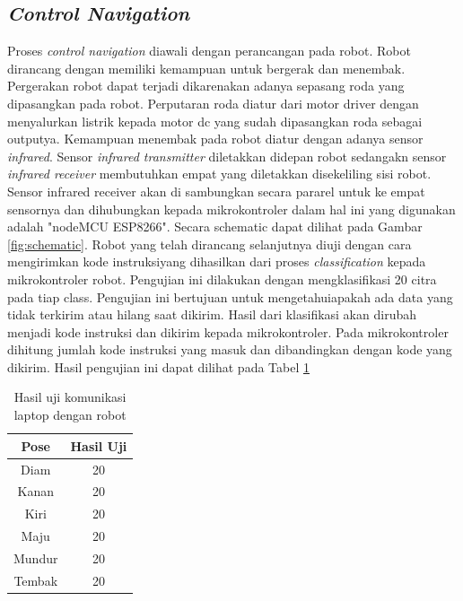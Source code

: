 \subsection{\emph{Control Navigation}}
Proses \emph{control navigation} diawali dengan perancangan pada robot. Robot dirancang dengan memiliki kemampuan untuk bergerak dan menembak. Pergerakan robot dapat terjadi dikarenakan adanya sepasang roda yang dipasangkan pada robot. Perputaran roda diatur dari motor driver dengan menyalurkan listrik kepada motor dc yang sudah dipasangkan roda sebagai outputya. Kemampuan menembak pada robot diatur dengan adanya sensor \emph{infrared}. Sensor \emph{infrared transmitter} diletakkan didepan robot sedangakn sensor \emph{infrared receiver} membutuhkan empat yang diletakkan disekeliling sisi robot. Sensor infrared receiver akan di sambungkan secara pararel untuk ke empat sensornya dan dihubungkan kepada mikrokontroler dalam hal ini yang digunakan adalah "nodeMCU ESP8266". Secara schematic dapat dilihat pada Gambar \ref{fig:schematic}. Robot yang telah dirancang selanjutnya diuji dengan cara mengirimkan kode instruksiyang dihasilkan dari proses \emph{classification} kepada mikrokontroler robot. Pengujian ini dilakukan dengan mengklasifikasi 20 citra pada tiap class. Pengujian ini bertujuan untuk mengetahuiapakah ada data yang tidak terkirim atau hilang saat dikirim. Hasil dari klasifikasi akan dirubah menjadi kode instruksi dan dikirim kepada mikrokontroler. Pada mikrokontroler dihitung jumlah kode instruksi yang masuk dan dibandingkan dengan kode yang dikirim. Hasil pengujian ini dapat dilihat pada Tabel \ref{tab:hasulujipose}

\begin{table}[H]
  \centering
  \caption{Hasil uji komunikasi laptop dengan robot}
  \label{tab:hasulujipose}
  \begin{tabular}{|c|c|}
  \hline
  Pose   &  Hasil Uji\\ \hline
  Diam   & 20              \\ \hline
  Kanan  & 20             \\ \hline
  Kiri   & 20              \\ \hline
  Maju   & 20              \\ \hline
  Mundur & 20              \\ \hline
  Tembak & 20              \\ \hline
  \end{tabular}
\end{table}

